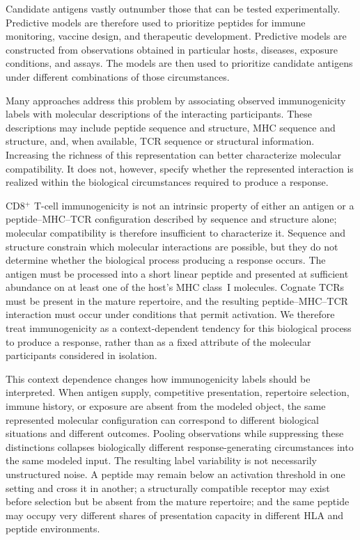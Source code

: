 \documentclass[11pt]{article}
\begin{document}
\else
Candidate antigens vastly outnumber those that can be tested experimentally.
Predictive models are therefore used to prioritize peptides for immune
monitoring, vaccine design, and therapeutic development. Predictive models are
constructed from observations obtained in particular hosts, diseases, exposure
conditions, and assays. The models are then used to prioritize candidate
antigens under different combinations of those circumstances.

Many approaches address this problem by associating observed immunogenicity
labels with molecular descriptions of the interacting participants. These
descriptions may include peptide sequence and structure, MHC sequence and
structure, and, when available, TCR sequence or structural information.
Increasing the richness of this representation can better characterize
molecular compatibility. It does not, however, specify whether the represented
interaction is realized within the biological circumstances required to
produce a response.

CD8$^{+}$ T-cell immunogenicity is not an intrinsic property of either an
antigen or a peptide--MHC--TCR configuration described by sequence and
structure alone; molecular compatibility is therefore insufficient to
characterize it. Sequence and structure constrain which molecular interactions
are possible, but they do not determine whether the biological process
producing a response occurs. The antigen must be processed into a short linear
peptide and presented at sufficient abundance on at least one of the host's MHC
class~I molecules. Cognate TCRs must be present in the mature repertoire, and
the resulting peptide--MHC--TCR interaction must occur under conditions that
permit activation. We therefore treat immunogenicity as a context-dependent
tendency for this biological process to produce a response, rather than as a
fixed attribute of the molecular participants considered in isolation.

This context dependence changes how immunogenicity labels should be
interpreted. When antigen supply,
competitive presentation, repertoire selection, immune history, or exposure
are absent from the modeled object, the same represented molecular
configuration can correspond to different biological situations and different
outcomes. Pooling observations while suppressing these distinctions collapses
biologically different response-generating circumstances into the same modeled
input. The resulting label variability is not necessarily unstructured noise.
A peptide may remain below an activation threshold in one setting and cross it
in another; a structurally compatible receptor may exist before selection but
be absent from the mature repertoire; and the same peptide may occupy very
different shares of presentation capacity in different HLA and peptide
environments.
\end{document}
